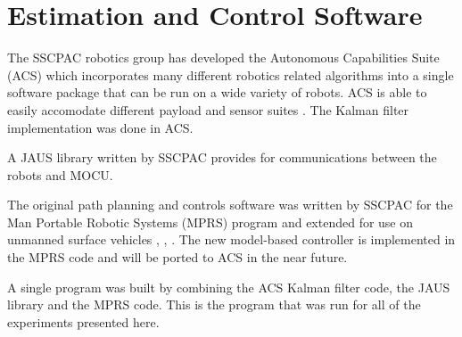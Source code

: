 \section{Estimation and Control Software}
\label{sec:bgSoftware}
The SSCPAC robotics group has developed the Autonomous Capabilities Suite (ACS) which incorporates many different robotics related algorithms into a single software package that can be run on a wide variety of robots. ACS is able to easily accomodate different payload and sensor suites \cite{Sights06}. The Kalman filter implementation was done in ACS.

A JAUS library written by SSCPAC provides for communications between the robots and MOCU.

The original path planning and controls software was written by SSCPAC for the Man Portable Robotic Systems (MPRS) program \cite{Bruch02} and extended for use on unmanned surface vehicles \cite{Ebken05}, \cite{Larson06}, \cite{Larson07}. The new model-based controller is implemented in the MPRS code and will be ported to ACS in the near future.

A single program was built by combining the ACS Kalman filter code, the JAUS library and the MPRS code. This is the program that was run for all of the experiments presented here.
